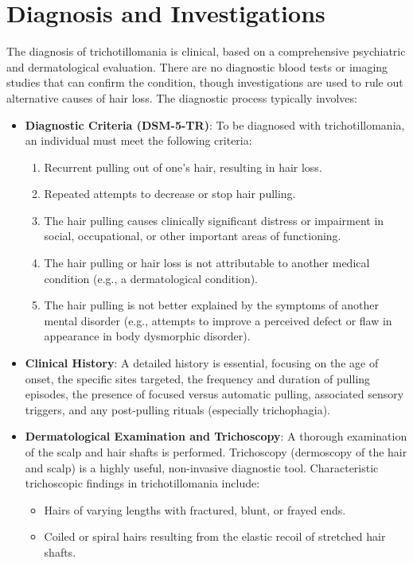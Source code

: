 \section*{Diagnosis and Investigations}
The diagnosis of trichotillomania is clinical, based on a comprehensive psychiatric and dermatological evaluation. There are no diagnostic blood tests or imaging studies that can confirm the condition, though investigations are used to rule out alternative causes of hair loss. The diagnostic process typically involves:

\begin{itemize}
    \item \textbf{Diagnostic Criteria (DSM-5-TR)}: To be diagnosed with trichotillomania, an individual must meet the following criteria:
    \begin{enumerate}
        \item Recurrent pulling out of one's hair, resulting in hair loss.
        \item Repeated attempts to decrease or stop hair pulling.
        \item The hair pulling causes clinically significant distress or impairment in social, occupational, or other important areas of functioning.
        \item The hair pulling or hair loss is not attributable to another medical condition (e.g., a dermatological condition).
        \item The hair pulling is not better explained by the symptoms of another mental disorder (e.g., attempts to improve a perceived defect or flaw in appearance in body dysmorphic disorder).
    \end{enumerate}
    \item \textbf{Clinical History}: A detailed history is essential, focusing on the age of onset, the specific sites targeted, the frequency and duration of pulling episodes, the presence of focused versus automatic pulling, associated sensory triggers, and any post-pulling rituals (especially trichophagia).
    \item \textbf{Dermatological Examination and Trichoscopy}: A thorough examination of the scalp and hair shafts is performed. Trichoscopy (dermoscopy of the hair and scalp) is a highly useful, non-invasive diagnostic tool. Characteristic trichoscopic findings in trichotillomania include:
    \begin{itemize}
        \item Hairs of varying lengths with fractured, blunt, or frayed ends.
        \item Coiled or spiral hairs resulting from the elastic recoil of stretched hair shafts.

\end{itemize}
\end{itemize}
